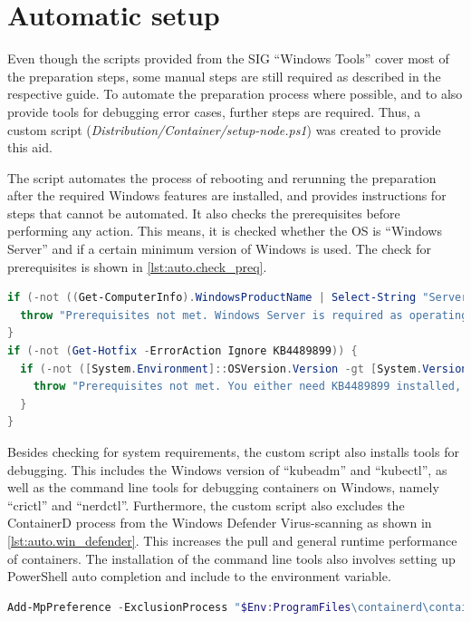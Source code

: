 \section{Automatic setup}
Even though the scripts provided from the \ac{SIG} \enquote{Windows Tools} cover most of the preparation steps, some manual steps are still required as described in the respective guide\cite{GitHubKubernetesSIGWindowsTools.20230213}. To automate the preparation process where possible, and to also provide tools for debugging error cases, further steps are required. Thus, a custom script (\textit{Distribution/Container/setup-node.ps1}) was created to provide this aid.

The script automates the process of rebooting and rerunning the preparation after the required \ac{Windows} features are installed, and provides instructions for steps that cannot be automated. It also checks the prerequisites before performing any action. This means, it is checked whether the \ac{OS} is \enquote{\ac{Windows} Server} and if a certain minimum version of \ac{Windows} is used. The check for prerequisites is shown in \autoref{lst:auto.check_preq}.
\begin{lstlisting}[label=lst:auto.check_preq, caption={Powershell commands in the automated setup script. Checks for prerequisites.}, language=PowerShell]
if (-not ((Get-ComputerInfo).WindowsProductName | Select-String "Server")) {
  throw "Prerequisites not met. Windows Server is required as operating system."
}
if (-not (Get-Hotfix -ErrorAction Ignore KB4489899)) {
  if (-not ([System.Environment]::OSVersion.Version -gt [System.Version]"10.0.17763.0")) {
    throw "Prerequisites not met. You either need KB4489899 installed, or a Windows Version higher than 10.0.17763"
  }
}
\end{lstlisting}

Besides checking for system requirements, the custom script also installs tools for debugging. This includes the \ac{Windows} version of \enquote{kubeadm} and \enquote{kubectl}, as well as the command line tools for debugging containers on \ac{Windows}, namely \enquote{crictl} and \enquote{nerdctl}.
Furthermore, the custom script also excludes the ContainerD process from the \ac{Windows} Defender Virus-scanning as shown in \autoref{lst:auto.win_defender}. This increases the pull and general runtime performance of containers.
The installation of the command line tools also involves setting up PowerShell auto completion and include to the  environment variable.
\begin{lstlisting}[label=lst:auto.win_defender, caption={Powershell command in the automated setup script. Exclusion of all actions performed by containerd.exe from Windows Defender.}, language=PowerShell, numbers=none]
Add-MpPreference -ExclusionProcess "$Env:ProgramFiles\containerd\containerd.exe"
\end{lstlisting}


